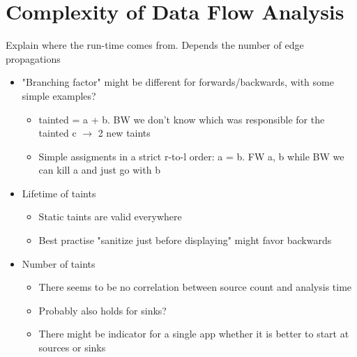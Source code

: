\documentclass[../draft.tex]{subfiles}
\begin{document}
    \section{Complexity of Data Flow Analysis}
    Explain where the run-time comes from.
    Depends the number of edge propagations
    \begin{itemize}
        \item "Branching factor" might be different for forwards/backwards, with some simple examples?
            \begin{itemize}
                \item  tainted = a + b. BW we don't know which was responsible for the tainted c $\rightarrow$ 2 new taints
                \item Simple assigments in a strict r-to-l order: a = b. FW {a, b} while BW we can kill a and just go with {b}
            \end{itemize}
        \item Lifetime of taints 
        \begin{itemize}
            \item Static taints are valid everywhere
            \item Best practise "sanitize just before displaying" might favor backwards
        \end{itemize}
        \item Number of taints
        \begin{itemize}
            \item There seems to be no correlation between source count and analysis time
            \item Probably also holds for sinks?
            \item There might be indicator for a single app whether it is better to start at sources or sinks
        \end{itemize}


    \end{itemize}
\end{document}
